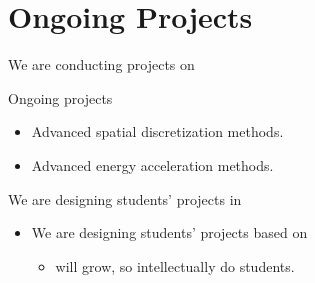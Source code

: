 \section{Ongoing Projects}
\begin{frame}{We are conducting projects on }
	\begin{block}{Ongoing projects}
		\begin{itemize}
			\item Advanced spatial discretization methods.
			\item Advanced energy acceleration methods.
		\end{itemize}
	\end{block}
	\begin{block}{We are designing students' projects in }
		\begin{itemize}
			\item We are designing students' projects based on 
			\begin{itemize}
				\item {} will grow, so intellectually do students.
			\end{itemize}
		\end{itemize}
	\end{block}
\end{frame}
